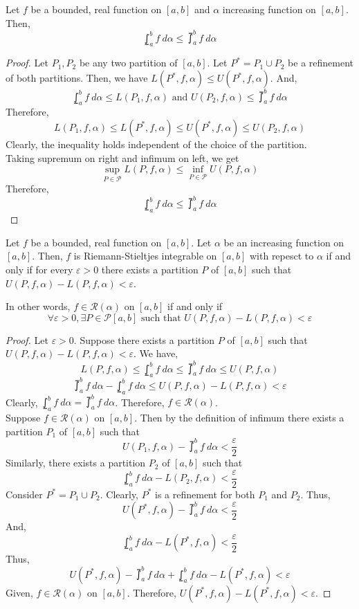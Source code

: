 \begin{theorem}
	Let $f$ be a bounded, real function on $[a,b]$ and $\alpha$ increasing function on $[a,b]$.
	Then,
	\[ \lowint_a^b f\ d\alpha \le \upint_a^b f\ d\alpha \]
\end{theorem}
\begin{proof}
	Let $P_1,P_2$ be any two partition of $[a,b]$.
	Let $P^\ast = P_1 \cup P_2$ be a refinement of both partitions.
	Then, we have $L(P^\ast,f,\alpha) \le U(P^\ast,f,\alpha)$.
	And,
	\[ \lowint_a^b f\ d\alpha \le L(P_1,f,\alpha) \text{ and } U(P_2,f,\alpha) \le \upint_a^b f\ d\alpha \]
	Therefore, \[ L(P_1,f,\alpha) \le L(P^\ast,f,\alpha) \le U(P^\ast,f,\alpha) \le U(P_2,f,\alpha) \]
	Clearly, the inequality holds independent of the choice of the partition.\\
	Taking supremum on right and infimum on left, we get
	\[ \sup_{P \in \mathscr{P}} L(P,f,\alpha) \le \inf_{ P \in \mathscr{P}} U(P,f,\alpha) \]
	Therefore,
	\[ \lowint_a^b f\ d\alpha \le \upint_a^b f\ d\alpha \]
\end{proof}

\begin{theorem}
	Let $f$ be  a bounded, real function on $[a,b]$.
	Let $\alpha$ be an increasing function on $[a,b]$.
	Then, $f$ is Riemann-Stieltjes integrable on $[a,b]$ with repesct to $\alpha$ if and only if for every $\varepsilon > 0$ there exists a partition $P$ of $[a,b]$ such that $U(P,f,\alpha) - L(P,f,\alpha) < \varepsilon$.
\end{theorem}
\begin{commentary}
	In other words, $f \in \mathscr{R}(\alpha)$ on $[a,b]$ if and only if 
	\[ \forall \varepsilon > 0, \exists P \in \mathscr{P}[a,b] \text{ such that }U(P,f,\alpha) - L(P,f,\alpha) < \varepsilon \]
\end{commentary}
\begin{proof}
	Let $\varepsilon > 0$.
	Suppose there exists a partition $P$ of $[a,b]$ such that $U(P,f,\alpha) - L(P,f,\alpha) < \varepsilon$.
	We have,
	\[ L(P,f,\alpha) \le \lowint_a^b f\ d\alpha \le \upint_a^b f\ d\alpha \le U(P,f,\alpha) \]
	\[ \upint_a^b f\ d\alpha - \lowint_a^b f\ d\alpha \le U(P,f,\alpha)-L(P,f,\alpha) < \varepsilon \]
	Clearly, $\lowint_a^b f\ d\alpha = \upint_a^b f\ d\alpha$.
	Therefore, $f \in \mathscr{R}(\alpha)$.\\

	Suppose $f \in \mathscr{R}(\alpha)$ on $[a,b]$.
	Then by the definition of infimum there exists a partition $P_1$ of $[a,b]$ such that 
	\[ U(P_1,f,\alpha) - \upint_a^b f\ d\alpha < \frac{\varepsilon}{2} \]
	Similarly, there exists a partition $P_2$ of $[a,b]$ such that
	\[ \lowint_a^b f\ d\alpha - L(P_2,f,\alpha) < \frac{\varepsilon}{2} \]
	Consider $P^\ast = P_1 \cup P_2$.
	Clearly, $P^\ast$ is a refinement for both $P_1$ and $P_2$.
	Thus, \[ U(P^\ast,f,\alpha) - \upint_a^b f\ d\alpha < \frac{\varepsilon}{2} \]
	And,
	\[ \lowint_a^b f\ d\alpha - L(P^\ast,f,\alpha) < \frac{\varepsilon}{2} \]
	Thus, \[ U(P^\ast,f,\alpha) - \upint_a^b f\ d\alpha + \lowint_a^b f\ d\alpha - L(P^\ast,f,\alpha) < \varepsilon \]
	Given, $f \in \mathscr{R}(\alpha)$ on $[a,b]$.
	Therefore, $U(P^\ast,f,\alpha) - L(P^\ast,f,\alpha) < \varepsilon$.
\end{proof}

